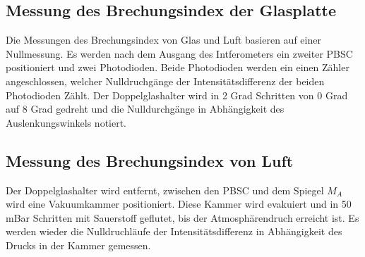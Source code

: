 \subsection{Messung des Brechungsindex der Glasplatte}
Die Messungen des Brechungsindex von Glas und Luft basieren auf einer Nullmessung. Es werden nach dem Ausgang des Intferometers ein zweiter PBSC positioniert und zwei Photodioden.
Beide Photodioden werden ein einen Zähler angeschlossen, welcher Nulldruchgänge der Intensitätsdifferenz der beiden Photodioden Zählt. Der Doppelglashalter wird 
in 2 Grad Schritten von 0 Grad auf 8 Grad gedreht und die Nulldurchgänge in Abhängigkeit des Auslenkungswinkels notiert.

\subsection{Messung des Brechungsindex von Luft}
Der Doppelglashalter wird entfernt, zwischen den PBSC und dem Spiegel $M_A$ wird eine Vakuumkammer positioniert. Diese Kammer wird evakuiert und in 50 mBar Schritten
mit Sauerstoff geflutet, bis der Atmosphärendruch erreicht ist. Es werden wieder die Nulldruchläufe der Intensitätsdifferenz in Abhängigkeit des
Drucks in der Kammer gemessen.
